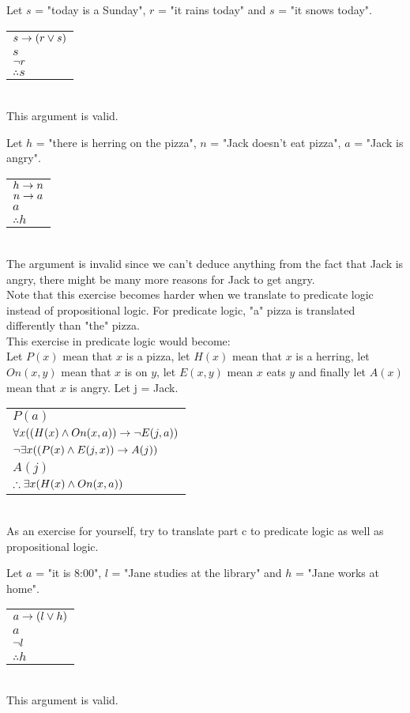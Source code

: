 \begin{solutions}
 	\solution
	\setcounter{solutioncounter}{4}
	\spart 
	Let $s$ = "today is a Sunday", $r$ = "it rains today" and $s$ = "it snows today". \\
	\begin{tabular}{l}
		$s \rightarrow (r \vee s)$\\
		$s$ \\
		$\lnot r$\\
		\hline
		$\therefore s$
	\end{tabular} \\
	This argument is valid. 
	
	\spart
	Let $h$ = "there is herring on the pizza", $n$ = "Jack doesn't eat pizza", $a$ = "Jack is angry". \\
	\begin{tabular}{l}
		$h \rightarrow n$\\
		$n \rightarrow a$ \\
		$a$\\
		\hline
		$\therefore h$
	\end{tabular} \\
	The argument is invalid since we can't deduce anything from the fact that Jack is angry, there might be many more reasons for Jack to get angry. \\
	Note that this exercise becomes harder when we translate to predicate logic instead of propositional logic. For predicate logic, "a" pizza is translated differently than "the" pizza.\\ 
	This exercise in predicate logic would become: \\
	Let $P(x)$ mean that $x$ is a pizza, let $H(x)$ mean that $x$ is a herring, let $On(x,y)$ mean that $x$ is on $y$, let $E(x,y)$ mean $x$ eats $y$ and finally let $A(x)$ mean that $x$ is angry. Let j = Jack. \\
	\begin{tabular}{l}
		$P(a)$ \\
		$\forall x((H(x) \wedge On(x,a)) \rightarrow \lnot E(j,a))$ \\
		$\lnot \exists x((P(x) \wedge E(j,x)) \rightarrow A(j))$ \\
		$A(j)$ \\
		\hline
		$\therefore \exists x (H(x) \wedge On(x,a))$
	\end{tabular} \\
	As an exercise for yourself, try to translate part c to predicate logic as well as propositional logic.
	
	\spart
	Let $a$ = "it is 8:00", $l$ = "Jane studies at the library" and $h$ = "Jane works at home". \\
	\begin{tabular}{l}
		$a \rightarrow (l \vee h)$\\
		$a$ \\
		$\lnot l$\\
		\hline
		$\therefore h$
	\end{tabular} \\
	This argument is valid.
	
	
	
\end{solutions}
